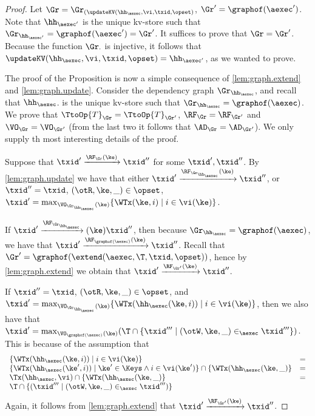 \begin{proof}
Let $\Gr = \Gr_{(\updateKV(\hh_{\aexec}, \vi, \txid, \opset)}$, $\Gr' = \graphof(\aexec')$. 
Note that $\hh_{\aexec'}$ is the unique kv-store such that $\Gr_{\hh_{\aexec'}} = \graphof(\aexec') = \Gr'$. 
It suffices to prove that $\Gr = \Gr'$. Because the function $\Gr_{\cdot}$ is injective, it follows that 
$\updateKV(\hh_{\aexec}, \vi, \txid, \opset) = \hh_{\aexec'}$, as we wanted to prove.  

The proof of the Proposition is now a simple consequence of \cref{lem:graph.extend} and \cref{lem:graph.update}. 
Consider the dependency graph $\Gr_{\hh_{\aexec}}$, and recall that $\hh_{\aexec}$. 
is the unique kv-store such that $\Gr_{\hh_{\aexec}} = \graphof(\aexec)$. 
We prove that $\TtoOp{T}_{\Gr} = \TtoOp{T}_{\Gr'}$, $\RF_{\Gr} = \RF_{\Gr'}$ and 
$\VO_{\Gr} = \VO_{\Gr'}$ (from the last two it follows that $\AD_{\Gr} = \AD_{\Gr'}$). 
We only supply th most interesting details of the proof.

Suppose that $\txid' \xrightarrow{\RF_{\Gr}(\ke)} \txid''$ for some $\txid', \txid''$. 
By \ref{lem:graph.update} we have that either $\txid' \xrightarrow{\RF_{\Gr_{\hh_{\aexec}}}(\ke)} \txid''$, 
or $\txid'' = \txid$, $(\otR, \ke, \_) \in \opset$, $\txid' = \max_{\VO_{\Gr_{\hh_{\aexec}}}(\ke)}\{\WTx(\ke, i) \mid i \in \vi(\ke)\}$. 

If $\txid' \xrightarrow{\RF_{\Gr_{\hh_{\aexec}}}}(\ke) \txid''$, then because 
$\Gr_{\hh_{\aexec}} = \graphof(\aexec)$, we have that $\txid' \xrightarrow{\RF_{\graphof(\aexec)}(\ke)} \txid''$. 
Recall that $\Gr' = \graphof(\extend(\aexec, \T, \txid, \opset))$, hence by \cref{lem:graph.extend} 
we obtain that $\txid' \xrightarrow{\RF_{\Gr'}(\ke)} \txid''$. 

If $\txid'' = \txid$, $(\otR, \ke, \_) \in \opset$, and $\txid' = \max_{\VO_{\Gr_{\hh_{\aexec}}}(\ke)} \{ \WTx(\hh_{\aexec}(\ke, i)) \mid i \in \vi(\ke)\}$, 
then we also have that $\txid' = \max_{\VO_{\graphof(\aexec)}(\ke)} (\T \cap \{ \txid''' \mid (\otW, \ke, \_) \in_{\aexec} \txid'''\}) $. 
This is because of the assumption that 
\[
\begin{array}{lr}
\{\WTx(\hh_{\aexec}(\ke, i)) \mid i \in \vi(\ke)\} &= \\
 \{\WTx(\hh_{\aexec}(\ke', i)) \mid \ke' \in \Keys \wedge i \in \vi(\ke')\} \cap \{\WTx(\hh_{\aexec}(\ke, \_)\} &=\\ 
 \Tx(\hh_{\aexec}, \vi) \cap \{\WTx(\hh_{\aexec}(\ke, \_)\} &=\\
 \T \cap \{(\txid''' \mid (\otW, \ke, \_) \in_{\aexec} \txid''')\}
 \end{array}
\]
Again, it follows from \cref{lem:graph.extend} that $\txid' \xrightarrow{\RF_{\Gr'}(\ke)} \txid''$. 
\end{proof}

